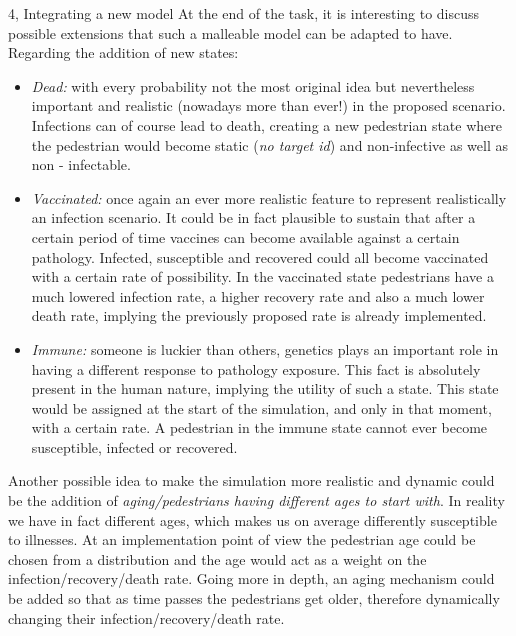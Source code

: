 \documentclass[10pt,a4paper]{article}
\begin{document}
\begin{task}{4, Integrating a new model}
At the end of the task, it is interesting to discuss possible extensions that such a malleable model can be adapted to have. Regarding the addition of new states:
\begin{itemize}
    \item \textit{Dead:} with every probability not the most original idea but nevertheless important and realistic (nowadays more than ever!) in the proposed scenario. Infections can of course lead to death, creating a new pedestrian state where the pedestrian would become static (\textit{no target id}) and non-infective as well as non - infectable.
    \item \textit{Vaccinated:} once again an ever more realistic feature to represent realistically an infection scenario. It could be in fact plausible to sustain that after a certain period of time vaccines can become available against a certain pathology. Infected, susceptible and recovered could all become vaccinated with a certain rate of possibility. In the vaccinated state pedestrians have a much lowered infection rate, a higher recovery rate and also a much lower death rate, implying the previously proposed rate is already implemented.
    \item \textit{Immune:} someone is luckier than others, genetics plays an important role in having a different response to pathology exposure. This fact is absolutely present in the human nature, implying the utility of such a state. This state would be assigned at the start of the simulation, and only in that moment, with a certain rate. A pedestrian in the immune state cannot ever become susceptible, infected or recovered.
\end{itemize}
Another possible idea to make the simulation more realistic and dynamic could be the addition of \textit{aging/pedestrians having different ages to start with}. In reality we have in fact different ages, which makes us on average differently susceptible to illnesses. At an implementation point of view the pedestrian age could be chosen from a distribution and the age would act as a weight on the infection/recovery/death rate. Going more in depth, an aging mechanism could be added so that as time passes the pedestrians get older, therefore dynamically changing their infection/recovery/death rate.
\end{task}
\end{document}
